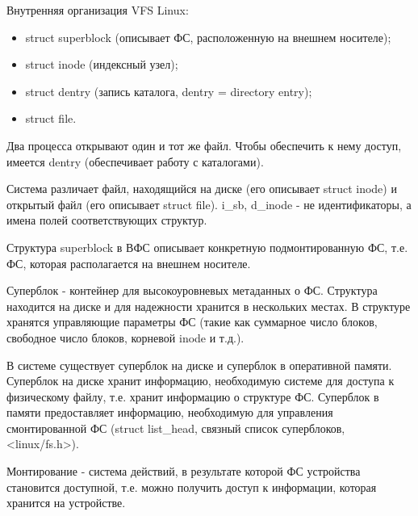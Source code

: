\documentclass[12pt,a4paper]{scrreprt}
\begin{document}
Внутренняя организация VFS Linux:

\begin{itemize}
	\item struct superblock (описывает ФС, расположенную на внешнем носителе);
	\item struct inode (индексный узел);
	\item struct dentry (запись каталога, dentry = directory entry);
	\item struct file.
\end{itemize}

\begin{figure}[!h]
\end{figure}

Два процесса открывают один и тот же файл. Чтобы обеспечить к нему доступ, имеется dentry (обеспечивает работу с каталогами).

Система различает файл, находящийся на диске (его описывает struct inode) и открытый файл (его описывает struct file). i\_sb, d\_inode - не идентификаторы, а имена полей соответствующих структур.

Структура superblock в ВФС описывает конкретную подмонтированную ФС, т.е. ФС, которая располагается на внешнем носителе.

Суперблок - контейнер для высокоуровневых метаданных о ФС. Структура находится на диске и для надежности хранится в нескольких местах. В структуре хранятся управляющие параметры ФС (такие как суммарное число блоков, свободное число блоков, корневой inode и т.д.).

В системе существует суперблок на диске и суперблок в оперативной памяти. Суперблок на диске хранит информацию, необходимую системе для доступа к физическому файлу, т.е. хранит информацию о структуре ФС. Суперблок в памяти предоставляет информацию, необходимую для управления смонтированной ФС (struct list\_head, связный список суперблоков, <linux/fs.h>).

Монтирование - система действий, в результате которой ФС устройства становится доступной, т.е. можно получить доступ к информации, которая хранится на устройстве.
\end{document}
